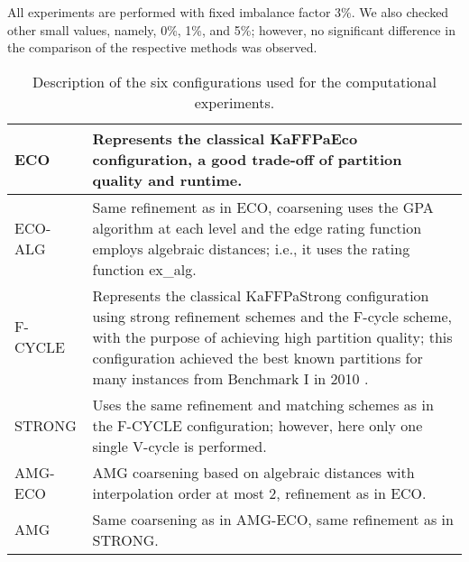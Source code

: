 \documentclass{llncs}
\begin{document}
\par All experiments are performed with fixed imbalance factor 3\%. We also checked other small values, namely, 0\%, 1\%, and 5\%; however, no significant difference in the comparison of the respective methods was observed.
\vfill
     \begin{table}[h!]

        \small

        \vspace{-.25cm}
        \begin{tabularx}{\textwidth}{|l|X|}
        
        \hline
 ECO  &Represents the classical KaFFPaEco configuration, a good trade-off of partition quality and runtime. \\
         \hline
ECO-ALG &  Same refinement as in ECO, coarsening uses the GPA algorithm at each level and the edge rating function employs algebraic distances; i.e., it uses the rating function ex\_alg.  \\
         \hline
F-CYCLE & Represents the classical KaFFPaStrong configuration using strong refinement schemes and the F-cycle scheme, with the purpose of achieving high partition quality; this configuration achieved the best known partitions for many instances from Benchmark I in 2010 \cite{kaffpa}.\\
         \hline
STRONG & Uses the same refinement and matching schemes as in the F-CYCLE configuration; however, here only one single V-cycle is performed. \\
         \hline
AMG-ECO & AMG coarsening based on algebraic distances with interpolation order at most 2, refinement as in ECO. \\
         \hline
AMG & Same coarsening as in AMG-ECO, same refinement as in STRONG.\\
        \hline
        \end{tabularx}
        \vspace{.25cm}
        \caption{Description of the six configurations used for the computational experiments.}
        \label{tab:configurations}
        \vspace{-.75cm}
        \end{table}
\end{document}
